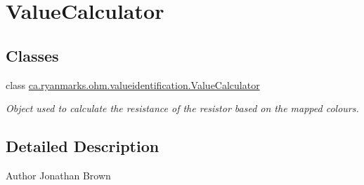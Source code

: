 \hypertarget{group___value_calculator}{}\section{Value\+Calculator}
\label{group___value_calculator}
\subsection*{Classes}
\begin{DoxyCompactItemize}
\item 
class \hyperlink{classca_1_1ryanmarks_1_1ohm_1_1valueidentification_1_1_value_calculator}{ca.\+ryanmarks.\+ohm.\+valueidentification.\+Value\+Calculator}
\begin{DoxyCompactList}\small\item\em Object used to calculate the resistance of the resistor based on the mapped colours. \end{DoxyCompactList}\end{DoxyCompactItemize}


\subsection{Detailed Description}
\begin{DoxyAuthor}{Author}
Jonathan Brown 
\end{DoxyAuthor}
